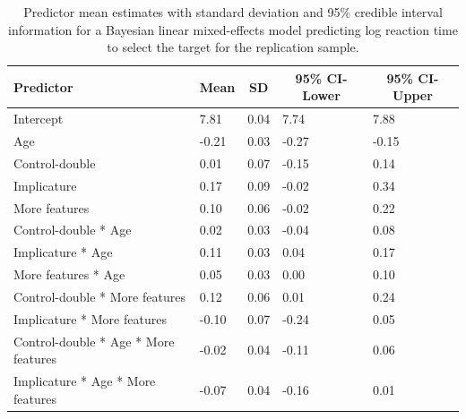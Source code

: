 \documentclass[mask,man]{apa6}
\begin{document}
\begin{table}[tbp]
\begin{center}
\begin{threeparttable}
\caption{\label{tab:brmrtSample2}Predictor mean estimates with standard deviation and 95\% credible interval information for a Bayesian linear mixed-effects model predicting log reaction time to select the target for the replication sample.}
\begin{tabular}{lllll}
\toprule
Predictor & \multicolumn{1}{c}{Mean} & \multicolumn{1}{c}{SD} & \multicolumn{1}{c}{95\% CI-Lower} & \multicolumn{1}{c}{95\% CI-Upper}\\
\midrule
Intercept & 7.81 & 0.04 & 7.74 & 7.88\\
Age & -0.21 & 0.03 & -0.27 & -0.15\\
Control-double & 0.01 & 0.07 & -0.15 & 0.14\\
Implicature & 0.17 & 0.09 & -0.02 & 0.34\\
More features & 0.10 & 0.06 & -0.02 & 0.22\\
Control-double * Age & 0.02 & 0.03 & -0.04 & 0.08\\
Implicature * Age & 0.11 & 0.03 & 0.04 & 0.17\\
More features * Age & 0.05 & 0.03 & 0.00 & 0.10\\
Control-double * More features & 0.12 & 0.06 & 0.01 & 0.24\\
Implicature * More features & -0.10 & 0.07 & -0.24 & 0.05\\
Control-double * Age * More features & -0.02 & 0.04 & -0.11 & 0.06\\
Implicature * Age * More features & -0.07 & 0.04 & -0.16 & 0.01\\
\bottomrule
\end{tabular}
\end{threeparttable}
\end{center}
\end{table}
\end{document}
